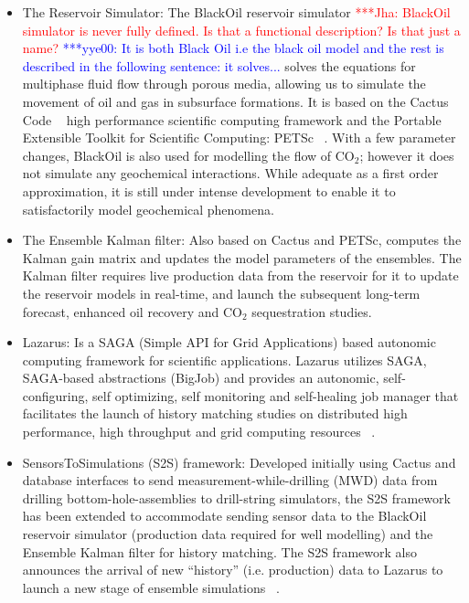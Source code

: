 \documentclass[10pt,conference,final]{IEEEtran}
\newcommand{\jhanote}[1]{ {\textcolor{red} { ***Jha: #1 }}}
\newcommand{\yyenote}[1]{ {\textcolor{blue} { ***yye00: #1 }}}
\newcommand{\jhanote}[1]{}
\newcommand{\yyenote}[1]{}
\begin{document}
\begin{itemize}
\item The Reservoir Simulator: The BlackOil reservoir simulator \jhanote{BlackOil simulator is never fully defined. Is that a functional description? Is that just a name?} \yyenote{It is both Black Oil i.e the black oil model and the rest is described in the following sentence: it solves...} solves the equations for multiphase fluid flow through porous media, allowing us to simulate the movement of oil and gas in subsurface formations. It is based on the Cactus Code ~\cite{cactus_web} high performance scientific computing framework and the Portable Extensible Toolkit for Scientific Computing: PETSc ~\cite{PETSc}. With a few parameter changes, BlackOil is also used for modelling the flow of CO$_2$; however it does not simulate any geochemical interactions. While adequate as a first order approximation, it is still under intense development to enable it to satisfactorily model geochemical phenomena.

\item The Ensemble Kalman filter: Also based on Cactus and PETSc, computes the Kalman 
gain matrix and updates the model parameters of the ensembles. The Kalman filter requires 
live production data from the reservoir for it to update the reservoir models in 
real-time, and launch the subsequent long-term forecast, enhanced oil recovery and CO$_2$ 
sequestration studies.

\item Lazarus: Is a SAGA (Simple API for Grid Applications) based autonomic computing 
framework for scientific applications. Lazarus utilizes SAGA, SAGA-based 
abstractions (BigJob) and provides an autonomic, self-configuring, self optimizing, self 
monitoring and self-healing job manager that facilitates the launch of history matching 
studies on distributed high performance, high throughput and grid computing resources 
~\cite{gmac}.

\item SensorsToSimulations (S2S) framework: Developed initially using Cactus and database interfaces to send measurement-while-drilling (MWD) data from drilling bottom-hole-assemblies to drill-string simulators, the S2S framework has been extended to accommodate sending sensor data to the BlackOil reservoir simulator (production data required for well modelling) and the Ensemble Kalman filter for history matching. The S2S framework also announces the arrival of new ``history'' (i.e. production) data to Lazarus to launch a new stage of ensemble simulations ~\cite{Duff2,Duff1}.

\end{itemize}
\end{document}
